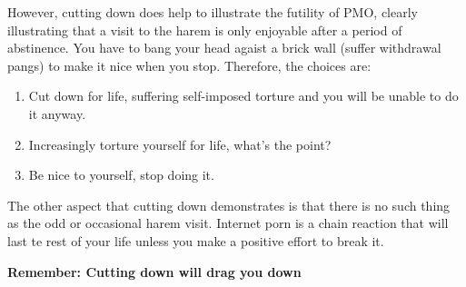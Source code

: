 \documentclass[easypeasy.tex]{subfiles}
\begin{document}
However, cutting down does help to illustrate the futility of PMO, clearly illustrating that a visit to the harem is only enjoyable after a period of abstinence. You have to bang your head agaist a brick wall (suffer withdrawal pangs) to make it nice when you stop. Therefore, the choices are:
\begin{enumerate}
  \item Cut down for life, suffering self-imposed torture and you will be unable to do it anyway.

  \item Increasingly torture yourself for life, what's the point?

  \item Be nice to yourself, stop doing it.

\end{enumerate}
The other aspect that cutting down demonstrates is that there is no such thing as the odd or occasional harem visit. Internet porn is a chain reaction that will last te rest of your life unless you make a positive effort to break it.

\textbf{Remember: Cutting down will drag you down}
\end{document}

